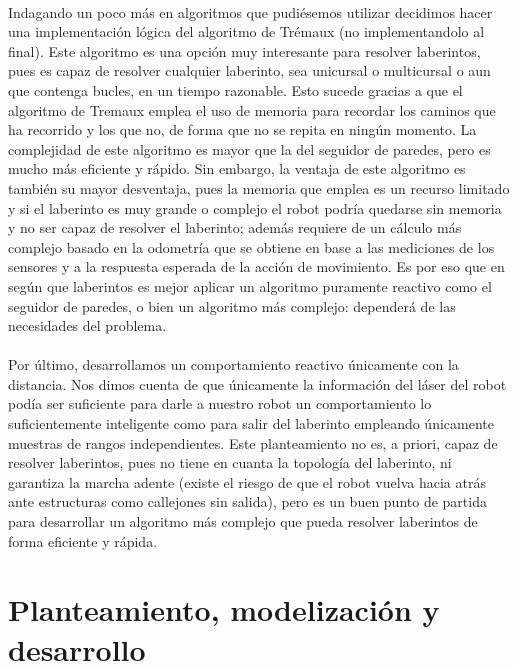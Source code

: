 \documentclass[a4paper,9pt]{article}
\begin{document}
\paragraph{}
Indagando un poco más en algoritmos que pudiésemos utilizar decidimos hacer una implementación lógica del algoritmo de Trémaux (no implementandolo al final). Este algoritmo es una opción muy interesante para resolver laberintos, pues es capaz de resolver cualquier laberinto, sea unicursal o multicursal o aun que contenga bucles, en un tiempo razonable. Esto sucede gracias a que el algoritmo de Tremaux emplea el uso de memoria para recordar los caminos que ha recorrido y los que no, de forma que no se repita en ningún momento. La complejidad de este algoritmo es mayor que la del seguidor de paredes, pero es mucho más eficiente y rápido. Sin embargo, la ventaja de este algoritmo es también su mayor desventaja, pues la memoria que emplea es un recurso limitado y si el laberinto es muy grande o complejo el robot podría quedarse sin memoria y no ser capaz de resolver el laberinto; además requiere de un cálculo más complejo basado en la odometría que se obtiene en base a las mediciones de los sensores y a la respuesta esperada de la acción de movimiento. Es por eso que en según que laberintos es mejor aplicar un algoritmo puramente reactivo como el seguidor de paredes, o bien un algoritmo más complejo: dependerá de las necesidades del problema.
\paragraph{}
Por último, desarrollamos un comportamiento reactivo únicamente con la distancia. Nos dimos cuenta de que únicamente la información del láser del robot podía ser suficiente para darle a nuestro robot un comportamiento lo suficientemente inteligente como para salir del laberinto empleando únicamente muestras de rangos independientes. Este planteamiento no es, a priori, capaz de resolver laberintos, pues no tiene en cuanta la topología del laberinto, ni garantiza la marcha adente (existe el riesgo de que el robot vuelva hacia atrás ante estructuras como callejones sin salida), pero es un buen punto de partida para desarrollar un algoritmo más complejo que pueda resolver laberintos de forma eficiente y rápida. 

\section{Planteamiento, modelización y desarrollo}
\end{document}
